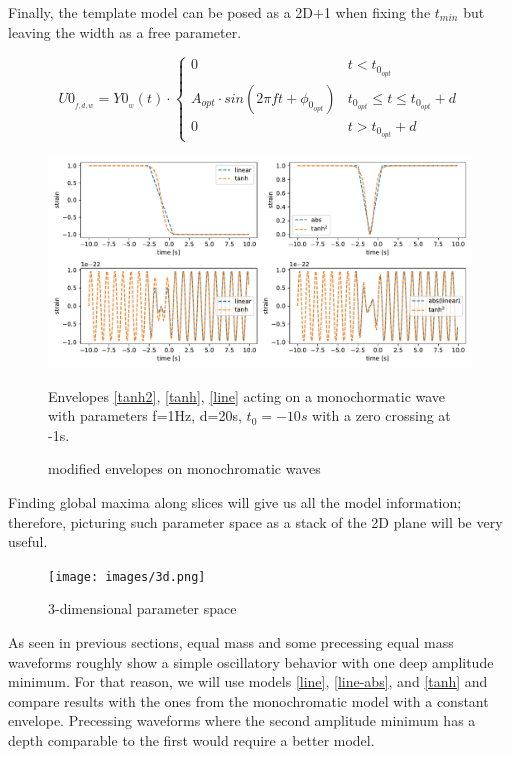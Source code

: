 Finally, the template model can be posed as a 2D+1 when fixing the $t_{min}$ but leaving the width as a free parameter.

\begin{equation}\label{3dim-model}
U0_{_{f,d, w}} = Y0_{_{w}}(t) \cdot
\begin{cases} 
      0 & t<t_{0_{opt}} \\
      A_{opt} \cdot sin(2\pi f t + \phi_{0_{opt}}) & t_{0_{opt}} \leq t\leq t_{0_{opt}}+d \\
      0 & t>t_{0_{opt}}+d
   \end{cases}
\end{equation}

\begin{figure}[hbt!]
\begin{center}
\includegraphics[width=\textwidth, angle=0]{images/Data_analysis/results/envel.pdf}
\caption{modified envelopes on monochromatic waves}
\label{env.ex}
\end{center}
Envelopes \ref{tanh2}, \ref{tanh}, \ref{line} acting on a monochormatic wave with parameters f=1Hz, d=20s, $t_{0}=-10s$ with a zero crossing at -1s.
\end{figure}
\FloatBarrier

Finding global maxima along slices will give us all the model information; therefore, picturing such parameter space as a stack of the 2D plane will be very useful.

\begin{figure}[hbt!]
\begin{center}
\texttt{[image: images/3d.png]}
\caption{3-dimensional parameter space}
\end{center}
\end{figure}
\FloatBarrier

As seen in previous sections, equal mass and some precessing equal mass waveforms roughly show a simple oscillatory behavior with one deep amplitude minimum. For that reason, we will use models \ref{line}, \ref{line-abs}, and \ref{tanh} and compare results with the ones from the monochromatic model with a constant envelope. Precessing waveforms where the second amplitude minimum has a depth comparable to the first would require a better model.

